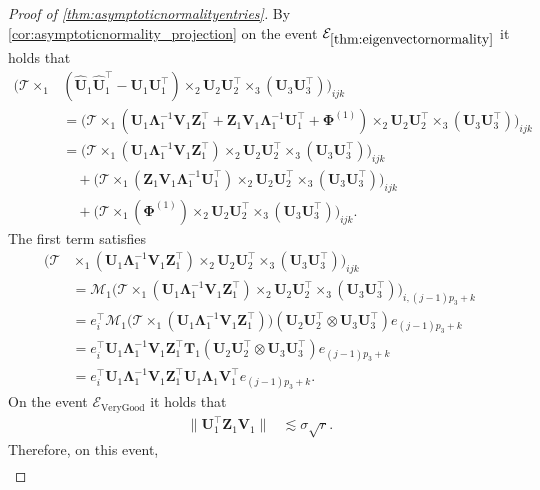 \documentclass[10pt]{article}
\newcommand{\0}{{\mathbf{0}}}
\newcommand{\1}{{\mathbf{1}}}
\newcommand{\U}{{\mathbf{U}}}
\renewcommand{\t}{^{\top}}
\newcommand{\uhat}{\mathbf{\hat{U}}}
\newcommand{\inv}{^{-1}}
\renewcommand{\hat}{\widehat}
\renewcommand{\hat}{\widehat}
\begin{document}
\begin{proof}[Proof of \cref{thm:asymptoticnormalityentries}]
By \cref{cor:asymptoticnormality_projection} on the event $\mathcal{E}_{\mathrm{\cref{thm:eigenvectornormality}}}$ it holds that
\begin{align*}
     \bigg( \mathcal{T} \times_1 &(\uhat_1 \uhat_1\t - \U_1\U_1\t) \times_2 \U_2 \U_2\t \times_3 ( \U_3 \U_3\t)\bigg)_{ijk} \\
     &=  \bigg( \mathcal{T} \times_1 (\mathbf{U}_1 \mathbf{\Lambda}_1\inv \mathbf{V}_1 \mathbf{Z}_1\t + \mathbf{Z}_1 \mathbf{V}_1 \mathbf{\Lambda}_1\inv \U_1\t + \mathbf{\Phi}^{(1)}) \times_2 \U_2 \U_2\t \times_3 ( \U_3 \U_3\t)\bigg)_{ijk} \\
     &= \bigg( \mathcal{T} \times_1 (\mathbf{U}_1 \mathbf{\Lambda}_1\inv \mathbf{V}_1 \mathbf{Z}_1\t ) \times_2 \U_2 \U_2\t \times_3 ( \U_3 \U_3\t)\bigg)_{ijk}  \\
     &\quad +\bigg( \mathcal{T} \times_1 ( \mathbf{Z}_1 \mathbf{V}_1 \mathbf{\Lambda}_1\inv \U_1\t ) \times_2 \U_2 \U_2\t \times_3 ( \U_3 \U_3\t)\bigg)_{ijk} \\
     &\quad +\bigg( \mathcal{T} \times_1 ( \mathbf{\Phi}^{(1)}) \times_2 \U_2 \U_2\t \times_3 ( \U_3 \U_3\t)\bigg)_{ijk}.
\end{align*}
The first term satisfies
\begin{align*}
    \bigg( \mathcal{T} &\times_1 ( \U_1 \mathbf{\Lambda}_1\inv \mathbf{V}_1 \mathbf{Z}_1\t) \times_2 \U_2 \U_2\t \times_3 ( \U_3 \U_3\t)\bigg)_{ijk} \\
    &= \mathcal{M}_1 \bigg( \mathcal{T} \times_1 ( \U_1 \mathbf{\Lambda}_1\inv \mathbf{V}_1 \mathbf{Z}_1\t) \times_2 \U_2 \U_2\t \times_3 ( \U_3 \U_3\t ) \bigg)_{i, (j-1)p_3 + k} \\
    &= e_i\t \mathcal{M}_1 \bigg( \mathcal{T} \times_1 ( \U_1 \mathbf{\Lambda}_1\inv \mathbf{V}_1 \mathbf{Z}_1\t) \bigg) ( \U_2 \U_2\t \otimes \U_3 \U_3\t ) e_{(j-1)p_3 + k} \\
    &= e_i\t \U_1 \mathbf{\Lambda}_1\inv \mathbf{V}_1 \mathbf{Z}_1\t \mathbf{T}_1 ( \U_2 \U_2\t \otimes \U_3 \U_3\t ) e_{(j-1)p_3 + k} \\
    &= e_i\t \U_1 \mathbf{\Lambda}_1\inv \mathbf{V}_1 \mathbf{Z}_1\t \U_1 \mathbf{\Lambda}_1 \mathbf{V}_1\t e_{(j-1)p_3 + k}.
\end{align*}
On the event $\mathcal{E}_{\mathrm{VeryGood}}$ it holds that
\begin{align*}
    \|\U_1 \t \mathbf{Z}_1 \mathbf{V}_1 \| &\lesssim \sigma \sqrt{r}.
\end{align*}
Therefore, on this event,
\begin{align*}

\end{align*}
\end{proof}
\end{document}
